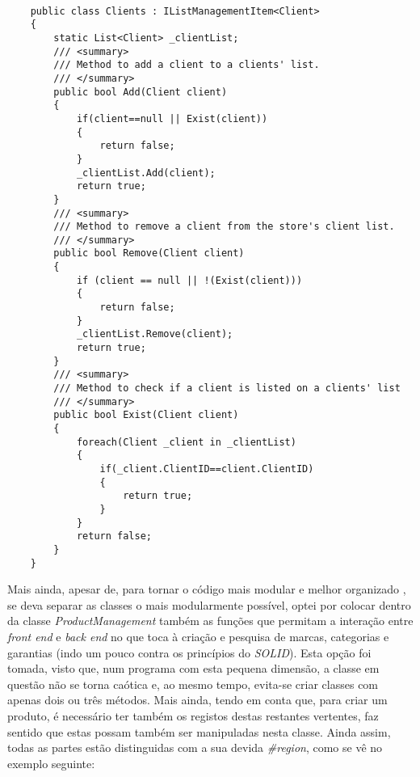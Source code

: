 \documentclass[11pt]{scrartcl} %
\begin{document}
\begin{lstlisting}[language={[Sharp]C}, caption={Implementação do Interface "T<Item>"}, label={Implementação do Interface "T<Item>"}]
	
	public class Clients : IListManagementItem<Client>
	{
		static List<Client> _clientList;
		/// <summary>
		/// Method to add a client to a clients' list.
		/// </summary>
		public bool Add(Client client)
		{
			if(client==null || Exist(client))
			{
				return false;
			}
			_clientList.Add(client);
			return true;
		}
		/// <summary>
		/// Method to remove a client from the store's client list.
		/// </summary>
		public bool Remove(Client client)
		{
			if (client == null || !(Exist(client)))
			{
				return false;
			}
			_clientList.Remove(client);
			return true;
		}
		/// <summary>
		/// Method to check if a client is listed on a clients' list
		/// </summary>
		public bool Exist(Client client)
		{
			foreach(Client _client in _clientList)
			{
				if(_client.ClientID==client.ClientID)
				{
					return true;
				}
			}
			return false;
		}
	}
\end{lstlisting}

\vspace{30px}
Mais ainda, apesar de, para tornar o código mais modular e melhor organizado , se deva separar as classes o mais modularmente possível, optei por colocar dentro da classe \textit{ProductManagement} também as funções que permitam a interação entre \textit{front end} e \textit{back end} no que toca à criação e pesquisa de marcas, categorias e garantias (indo um pouco contra os princípios do \textit{SOLID}). Esta opção foi tomada, visto que, num programa com esta pequena dimensão, a classe em questão não se torna caótica e, ao mesmo tempo, evita-se criar classes com apenas dois ou três métodos. Mais ainda, tendo em conta que, para criar um produto, é necessário ter também os registos destas restantes vertentes, faz sentido que estas possam também ser manipuladas nesta classe. Ainda assim, todas as partes estão distinguidas com a sua devida \textit{\#region}, como se vê no exemplo seguinte:
\end{document}
